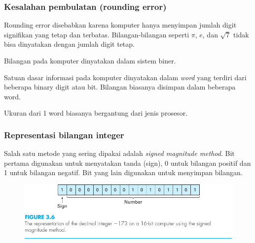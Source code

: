 \documentclass[9pt]{beamer}
\begin{document}
\begin{frame}
\frametitle{Kesalahan pembulatan (rounding error)}

Rounding error disebabkan karena komputer hanya menyimpan jumlah digit signifikan
yang tetap dan terbatas.
Bilangan-bilangan seperti $\pi$, $e$, dan $\sqrt{7}$ tidak bisa dinyatakan dengan jumlah
digit tetap.

Bilangan pada komputer dinyatakan dalam sistem biner.

Satuan dasar informasi pada komputer dinyatakan dalam \textit{word} yang terdiri dari
beberapa binary digit atau bit. Bilangan biasanya disimpan dalam beberapa word.

Ukuran dari 1 word biasanya bergantung dari jenis prosesor.

\end{frame}



\begin{frame}
\frametitle{Representasi bilangan integer}

Salah satu metode yang sering dipakai
adalah \textit{signed magnitude method}. Bit pertama digunakan untuk menyatakan
tanda (sign), 0 untuk bilangan positif dan 1 untuk bilangan negatif.
Bit yang lain digunakan untuk menyimpan bilangan.

\begin{figure}[H]
{\center
\includegraphics[scale=1.0]{images/Chapra_3_6.pdf}
\par}
\end{figure}

\end{frame}
\end{document}
